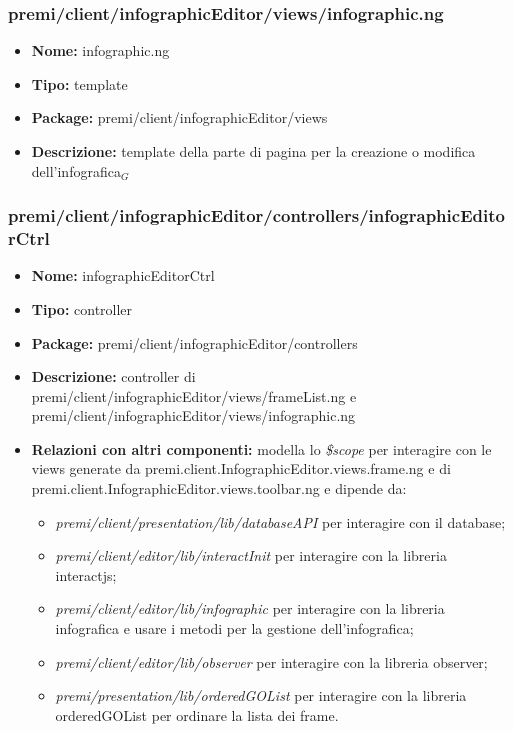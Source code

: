 \subsubsection{premi/client/infographicEditor/views/infographic.ng}
\begin{itemize}
  \item[] \textbf{Nome:} infographic.ng
  \item[] \textbf{Tipo:} template
  \item[] \textbf{Package:} premi/client/infographicEditor/views
  \item[] \textbf{Descrizione:}  template della parte di pagina per la creazione o modifica dell'infografica$_G$
\end{itemize}

\subsubsection{premi/client/infographicEditor/controllers/infographicEditorCtrl}
\begin{itemize}
  \item[] \textbf{Nome:} infographicEditorCtrl
  \item[] \textbf{Tipo:} controller
  \item[] \textbf{Package:} premi/client/infographicEditor/controllers
  \item[] \textbf{Descrizione:} controller di premi/client/infographicEditor/views/frameList.ng e premi/client/infographicEditor/views/infographic.ng
  \item[] \textbf{Relazioni con altri componenti:} modella lo \textit{\$scope} per interagire con le views generate da premi.client.InfographicEditor.views.frame.ng e di premi.client.InfographicEditor.views.toolbar.ng e dipende da: 
  \begin{itemize}  
  \item[] \textit{premi/client/presentation/lib/databaseAPI} per interagire con il database;
  \item[] \textit{premi/client/editor/lib/interactInit} per interagire con la libreria interactjs;
  \item[] \textit{premi/client/editor/lib/infographic} per interagire con la libreria infografica e usare i metodi per la gestione dell'infografica;
  \item[] \textit{premi/client/editor/lib/observer} per interagire con la libreria observer;
  \item[] \textit{premi/presentation/lib/orderedGOList} per interagire con la libreria orderedGOList per ordinare la lista dei frame. 
  \end{itemize}
\end{itemize}

